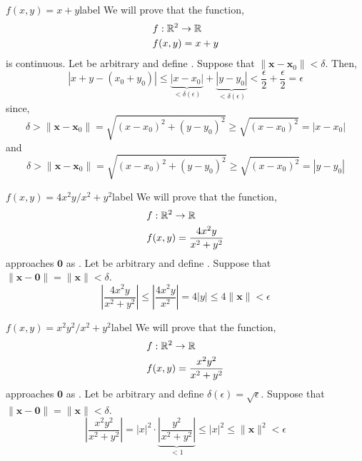 \begin{ex}{$f(x, y) = x + y$}{label}
    We will prove that the function,
    \begin{align*}
        &f: \mathbb{R}^2 \rightarrow \mathbb{R} \\
        &f(x, y) = x + y
    \end{align*}
    is continuous. Let  be arbitrary and define . Suppose that $\|\mathbf{x} - \mathbf{x}_0\| < \delta$. Then,
    \[|x + y - (x_0 + y_0)| \leq \underbrace{|x - x_0 |}_{< \delta(\epsilon)} + \underbrace{|y - y_0|}_{< \delta(\epsilon)} < \frac{\epsilon}{2} + \frac{\epsilon}{2} = \epsilon\]
    since,
    \[\delta > \|\mathbf{x} - \mathbf{x}_0\| = \sqrt{(x - x_0)^2 + (y - y_0)^2} \geq \sqrt{(x - x_0)^2} = |x - x_0|\]
    and
    \[\delta > \|\mathbf{x} - \mathbf{x}_0\| = \sqrt{(x - x_0)^2 + (y - y_0)^2} \geq \sqrt{(x - x_0)^2} = |y - y_0|\]
\end{ex}

\begin{ex}{$f(x, y) = 4x^2y / x^2 + y^2$}{label}
    We will prove that the function,
    \begin{align*}
        &f: \mathbb{R}^2 \rightarrow \mathbb{R} \\
        &f(x, y) = \frac{4x^2y}{x^2 + y^2}
    \end{align*}
    approaches $\mathbf{0}$ as . Let  be arbitrary and define . Suppose that $\|\mathbf{x} - \mathbf{0}\| = \|\mathbf{x}\| < \delta$.
    \[\left|\frac{4x^2y}{x^2 + y^2}\right| \leq \left|\frac{4x^2y}{x^2}\right| = 4 |y| \leq 4\|\mathbf{x}\| < \epsilon\]
\end{ex}

\begin{ex}{$f(x, y) = x^2y^2 / x^2 + y^2$}{label}
    We will prove that the function,
    \begin{align*}
        &f: \mathbb{R}^2 \rightarrow \mathbb{R} \\
        &f(x, y) = \frac{x^2y^2}{x^2 + y^2}
    \end{align*}
    approaches $\mathbf{0}$ as . Let  be arbitrary and define $\delta(\epsilon) = \sqrt{\epsilon}$. Suppose that $\|\mathbf{x} - \mathbf{0}\| = \|\mathbf{x}\| < \delta$.
    \[\left|\frac{x^2y^2}{x^2 + y^2}\right| = |x|^2 \cdot \underbrace{\left|\frac{y^2}{x^2 + y^2}\right|}_{< 1} \leq |x|^2 \leq \|\mathbf{x}\|^2 < \epsilon\]
\end{ex}